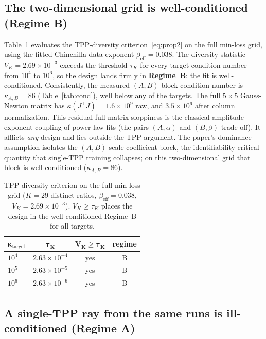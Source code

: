 \documentclass[11pt]{article}
\newcommand{\kAB}{\kappa_{A,B}}
\begin{document}
\subsection{The two-dimensional grid is well-conditioned (Regime B)}

Table~\ref{tab:regime} evaluates the TPP-diversity criterion~\eqref{eq:prop2} on the full
min-loss grid, using the fitted Chinchilla data exponent $\beta_{\mathrm{eff}}=0.038$. The diversity
statistic $V_K=2.69\times10^{-3}$ exceeds the threshold $\tau_K$ for every target condition number
from $10^{4}$ to $10^{6}$, so the design lands firmly in \textbf{Regime~B}: the fit is
well-conditioned. Consistently, the measured $(A,B)$-block condition number is $\kAB=86$
(Table~\ref{tab:cond}), well below any of the targets. The full $5\times5$ Gauss-Newton matrix has
$\kappa(J^\top J)=1.6\times10^{9}$ raw, and $3.5\times10^{6}$ after column normalization. This
residual full-matrix sloppiness is the classical amplitude-exponent coupling of power-law fits
(the pairs $(A,\alpha)$ and $(B,\beta)$ trade off). It afflicts \emph{any} design and lies
outside the TPP argument. The paper's dominance assumption isolates the $(A,B)$ scale-coefficient
block, the identifiability-critical quantity that single-TPP training collapses; on this
two-dimensional grid that block is well-conditioned ($\kAB=86$).

\begin{table}[t]
\centering
\caption{TPP-diversity criterion on the full min-loss grid ($K=29$ distinct ratios,
$\beta_{\mathrm{eff}}=0.038$, $V_K=2.69\times10^{-3}$). $V_K\ge\tau_K$ places the design in the
well-conditioned Regime~B for all targets.}
\label{tab:regime}
\begin{tabular}{lccc}
\toprule
$\boldsymbol{\kappa_{\mathrm{target}}}$ & $\boldsymbol{\tau_K}$ & $\boldsymbol{V_K\ge\tau_K}$ &
\textbf{regime}\\
\midrule
$10^{4}$ & $2.63\times10^{-4}$ & yes & B\\
$10^{5}$ & $2.63\times10^{-5}$ & yes & B\\
$10^{6}$ & $2.63\times10^{-6}$ & yes & B\\
\bottomrule
\end{tabular}
\end{table}

\subsection{A single-TPP ray from the same runs is ill-conditioned (Regime A)}
\end{document}
